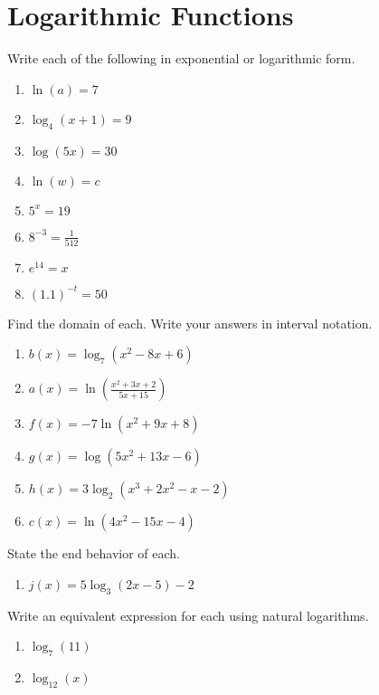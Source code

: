 \chapter{Logarithmic Functions}

Write each of the following in exponential or logarithmic form.
\begin{enumerate}
	\item $\ln(a) = 7$
    \item $\log_4 (x+1) = 9$
    \item $\log (5x) = 30$
    \item $\ln(w) = c$
    \item $5^x = 19$
    \item $8^{-3} = \frac{1}{512}$
    \item $e^{14} = x$
    \item $(1.1)^{-t} = 50$
\end{enumerate}	\setcounter{Review}{\value{enumi}}


Find the domain of each. Write your answers in interval notation.
\begin{enumerate}	\setcounter{enumi}{\value{Review}}
	\item $b(x) = \log_7\left(x^2 - 8x + 6\right)$
	\item $a(x) = \ln\left(\frac{x^2+3x+2}{5x+15}\right)$
	\item $f(x) = -7\ln\left(x^2 + 9x + 8\right)$
	\item $g(x) = \log\left(5x^2 + 13x - 6\right)$
	\item $h(x) = 3\log_2\left(x^3+2x^2-x-2\right)$
	\item $c(x) = \ln\left(4x^2 - 15x - 4\right)$
\end{enumerate}
\setcounter{Review}{\value{enumi}}

State the end behavior of each.
\begin{enumerate}	\setcounter{enumi}{\value{Review}}
	\item $j(x) = 5\log_3\left(2x-5\right) - 2$
\end{enumerate}	\setcounter{Review}{\value{enumi}}

Write an equivalent expression for each using natural logarithms.
\begin{enumerate}   \setcounter{enumi}{\value{Review}}
    \item $\log_7(11)$
    \item $\log_{12}(x)$
\end{enumerate} 	\setcounter{Review}{\value{enumi}}

